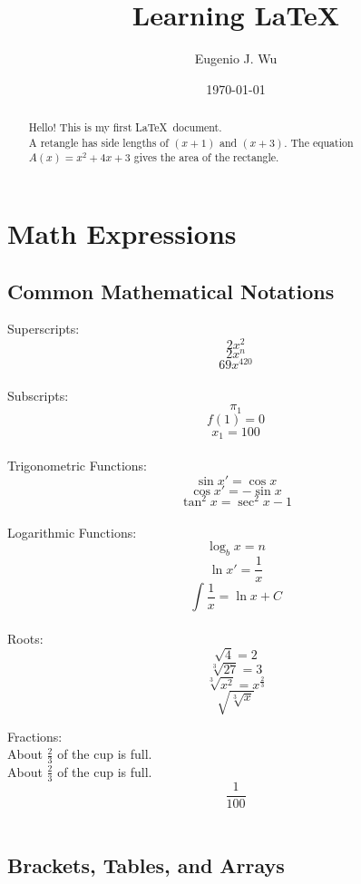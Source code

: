 \documentclass[12pt]{article}
\title{Learning \LaTeX}
\author{Eugenio J. Wu}
\date{\today}
\begin{document}
\maketitle 
\begin{abstract}
    \noindent 
    Hello! This is my first \LaTeX\, document. \\[5pt]
    A retangle has side lengths of $(x + 1)$ and $(x + 3)$. The equation ${  A(x) = x^2 + 4x + 3  }$ gives the area of the rectangle. \\[5pt]    
\end{abstract} \pagebreak


\tableofcontents \pagebreak


\section{Math Expressions}
\subsection{Common Mathematical Notations}

Superscripts: \\[5pt]
$${  2x^2  }$$
$${  2x^n  }$$
$${  69x^{420}  }$$ \\[5pt]

Subscripts: \\[5pt]
$${  \pi_1  }$$
$${  f(1) = 0  }$$
$${  x_1 = 100  }$$ \\[5pt]

Trigonometric Functions: \\[5pt]
$${  \sin x' = \cos x  }$$
$${  \cos x' = -\sin x  }$$
$${  \tan ^2x = \sec ^2x - 1  }$$ \\[5pt]

Logarithmic Functions: \\[5pt]
$${  \log _b x = n  }$$
$${  \ln x' = \frac{1}{x}  }$$
$${  \int \frac{1}{x} = \ln x + C}$$ \\[5pt]

Roots: \\[5pt]
$${  \sqrt{4} = 2  }$$
$${  \sqrt[3]{27} = 3  }$$
$${  \sqrt[3]{x^2} = x^\frac{2}{3}  }$$
$${  \sqrt{  \sqrt[3]{x}  }  }$$

Fractions: \\[5pt]
About ${  \frac{2}{3}  }$ of the cup is full. \\[5pt]
About ${  \displaystyle \frac{2}{3}  }$ of the cup is full.
$${  \frac{1}{100}  }$$ \\[5pt]


\subsection{Brackets, Tables, and Arrays}
\end{document}

